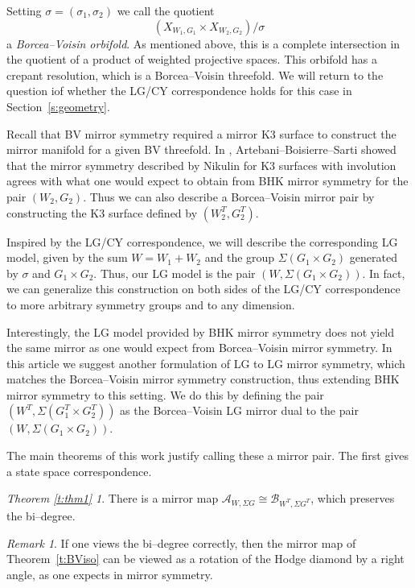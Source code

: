 \documentclass[10pt, letterpaper]{amsart}
\theoremstyle{remark}
\newtheorem{rem}{Remark}[thm]
\newtheorem*{thm1}{Theorem \ref{t:thm1}}
\newcommand{\sA}{\mathscr{A}}
\newcommand{\sB}{\mathscr{B}}
\newcommand{\s}[1]{\Sigma #1}
\DeclareMathOperator{\SL}{SL}
\begin{document}
Setting $\sigma=(\sigma_1,\sigma_2)$ we call the quotient 
\[
(X_{W_1,G_1}\times X_{W_2,G_2})/\sigma 
\]
a \emph{Borcea--Voisin orbifold}. As mentioned above, this is a complete intersection in the quotient of a product of weighted projective spaces. This orbifold has a crepant resolution, which is a Borcea--Voisin threefold. We will return to the question iof whether the LG/CY correspondence holds for this case in Section~\ref{s:geometry}.

Recall that BV mirror symmetry required a mirror K3 surface to construct the mirror manifold for a given BV threefold. In \cite{involutions}, Artebani--Boisierre--Sarti showed that the mirror symmetry described by Nikulin for K3 surfaces with involution agrees with what one would expect to obtain from BHK mirror symmetry for the pair $(W_2,G_2)$. Thus we can also describe a Borcea--Voisin mirror pair by constructing the K3 surface defined by $(W_2^T, G_2^T)$. 

Inspired by the LG/CY correspondence, we will describe the corresponding LG model, given by the sum $W=W_1+W_2$ and the group $\s{(G_1\times G_2)}$ generated by $\sigma$ and $G_1\times G_2$. Thus, our LG model is the pair $(W, \s{(G_1\times G_2)})$. In fact, we can generalize this construction on both sides of the LG/CY correspondence to more arbitrary symmetry groups and to any dimension.

Interestingly, the LG model provided by BHK mirror symmetry does not yield the same mirror as one would expect from Borcea--Voisin mirror symmetry. In this article we suggest another formulation of LG to LG mirror symmetry, which matches the Borcea--Voisin mirror symmetry construction, thus extending BHK mirror symmetry to this setting. We do this by defining the pair $(W^T,\s{(G_1^T\times G_2^T)})$ as the Borcea--Voisin LG mirror dual to the pair $(W, \s{(G_1\times G_2)})$.

The main theorems of this work justify calling these a mirror pair. The first gives a state space correspondence. 

\begin{thm1}
There is a mirror map $\sA_{W,\s{G}}\cong \sB_{W^T,\s{G^T}}$, which preserves the bi--degree. 
\end{thm1}

\begin{rem}
	If one views the bi--degree correctly, then the mirror map of Theorem~\ref{t:BViso} can be viewed as a rotation of the Hodge diamond by a right angle, as one expects in mirror symmetry.
\end{rem}
\end{document}

